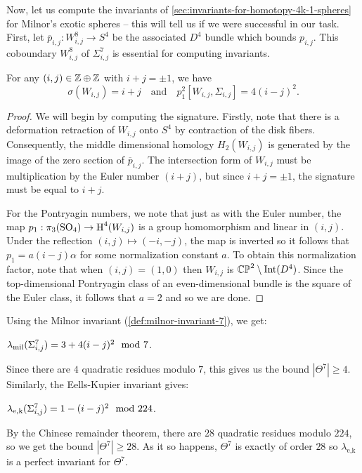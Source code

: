 Now, let us compute the invariants of \cref{sec:invariants-for-homotopy-4k-1-spheres} for Milnor's exotic spheres -- this will tell us if we were successful in our task. First, let $\overline{p}_{i,j} : W_{i,j}^8 \to S^4$ be the associated $D^4$ bundle which bounds $p_{i,j}$. This coboundary $W_{i,j}^8$ of $\Sigma^7_{i,j}$ is essential for computing invariants.

\begin{proposition}
	For any $(i,j)\in \mathbb{Z}\oplus \mathbb{Z}$ with $i+j=\pm 1$, we have
	\[
		\sigma(W_{i,j}) = i+j\quad\textrm{and}\quad p_1^2[W_{i,j}, \Sigma_{i,j}]=4(i-j)^2.
	\]
\end{proposition}
\begin{proof}
	We will begin by computing the signature. Firstly, note that there is a deformation retraction of $W_{i,j}$ onto $S^4$ by contraction of the disk fibers. Consequently, the middle dimensional homology $H_2(W_{i,j})$ is generated by the image of the zero section of $\overline{p}_{i,j}$. The intersection form of $W_{i,j}$ must be multiplication by the Euler number $(i+j)$, but since $i+j=\pm 1$, the signature must be equal to $i+j$.

	For the Pontryagin numbers, we note that just as with the Euler number, the map $p_1: \pi_3(\mathrm{SO}_4) \to \operatorname{H}^4(W_{i,j})$ is a group homomorphism and linear in $(i,j)$. Under the reflection $(i,j)\mapsto (-i,-j)$, the map is inverted so it follows that $p_1=a(i-j)\alpha$ for some normalization	constant $a$. To obtain this normalization factor, note that when $(i,j)=(1,0)$ then $W_{i,j}$ is $\mathbb{CP}^2\setminus \operatorname{Int}(D^4)$. Since the top-dimensional Pontryagin class of an even-dimensional bundle is the square of the Euler class, it follows that $a=2$ and so we are done.
\end{proof}

Using the Milnor invariant (\cref{def:milnor-invariant-7}), we get:
\begin{corollary}
	$\lambda_{\mathrm{mil}}(\Sigma^7_{i,j})=3+4(i-j)^2\mod 7$.
\end{corollary}

Since there are $4$ quadratic residues modulo $7$, this gives us the bound $|\Theta^7|\geq 4$. Similarly, the Eells-Kupier invariant gives:

\begin{corollary}
	$\lambda_{\mathrm{e,k}}(\Sigma^7_{i,j})=1-(i-j)^2\mod 224$.
\end{corollary}

By the Chinese remainder theorem, there are $28$ quadratic residues modulo $224$, so we get the bound $|\Theta^7|\geq 28$. As it so happens, $\Theta^7$ is exactly of order $28$ so $\lambda_{\textrm{e,k}}$ is a perfect invariant for $\Theta^7$.

